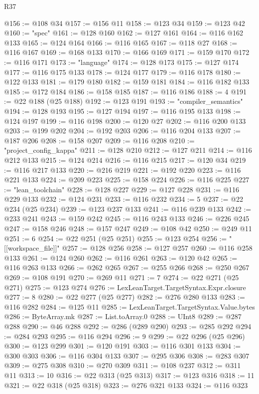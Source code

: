 \begin{lexlean}{R37}
\begin{coremodule}
@156 := @108 @34
@157 := @156 @11
@158 := @123 @34
@159 := @123 @42
@160 := "spec"
@161 := @128 @160
@162 := @127 @161
@164 := @116 @162 @133
@165 := @124 @164
@166 := @116 @165
@167 := @118 @27
@168 := @116 @167
@169 := @168 @133
@170 := @166 @169
@171 := @159 @170
@172 := @116 @171
@173 := "language"
@174 := @128 @173
@175 := @127 @174
@177 := @116 @175 @133
@178 := @124 @177
@179 := @116 @178
@180 := @122 @133
@181 := @179 @180
@182 := @159 @181
@184 := @116 @182 @133
@185 := @172 @184
@186 := @158 @185
@187 := @116 @186
@188 := 4
@191 := @22 @188 (@25 @188)
@192 := @123 @191
@193 := "compiler_semantics"
@194 := @128 @193
@195 := @127 @194
@197 := @116 @195 @133
@198 := @124 @197
@199 := @116 @198
@200 := @120 @27
@202 := @116 @200 @133
@203 := @199 @202
@204 := @192 @203
@206 := @116 @204 @133
@207 := @187 @206
@208 := @158 @207
@209 := @116 @208
@210 := "project_config_kappa"
@211 := @128 @210
@212 := @127 @211
@214 := @116 @212 @133
@215 := @124 @214
@216 := @116 @215
@217 := @120 @34
@219 := @116 @217 @133
@220 := @216 @219
@221 := @192 @220
@223 := @116 @221 @133
@224 := @209 @223
@225 := @158 @224
@226 := @116 @225
@227 := "lean_toolchain"
@228 := @128 @227
@229 := @127 @228
@231 := @116 @229 @133
@232 := @124 @231
@233 := @116 @232
@234 := 5
@237 := @22 @234 (@25 @234)
@239 := @123 @237 @133
@241 := @116 @239 @133
@242 := @233 @241
@243 := @159 @242
@245 := @116 @243 @133
@246 := @226 @245
@247 := @158 @246
@248 := @157 @247
@249 := @108 @42
@250 := @249 @11
@251 := 6
@254 := @22 @251 (@25 @251)
@255 := @123 @254
@256 := "[[workspace_file]]"
@257 := @128 @256
@258 := @127 @257
@260 := @116 @258 @133
@261 := @124 @260
@262 := @116 @261
@263 := @120 @42
@265 := @116 @263 @133
@266 := @262 @265
@267 := @255 @266
@268 := @250 @267
@269 := @108 @191
@270 := @269 @11
@271 := 7
@274 := @22 @271 (@25 @271)
@275 := @123 @274
@276 := LexLeanTarget.TargetSyntax.Expr.closure
@277 := 8
@280 := @22 @277 (@25 @277)
@282 := @276 @280 @133
@283 := @116 @282
@284 := @125 @11
@285 := LexLeanTarget.TargetSyntax.Value.bytes
@286 := ByteArray.mk
@287 := List.toArray.{0}
@288 := UInt8
@289 := @287 @288
@290 := @46 @288
@292 := @286 (@289 @290)
@293 := @285 @292
@294 := @284 @293
@295 := @116 @294
@296 := 9
@299 := @22 @296 (@25 @296)
@300 := @123 @299
@301 := @120 @191
@303 := @116 @301 @133
@304 := @300 @303
@306 := @116 @304 @133
@307 := @295 @306
@308 := @283 @307
@309 := @275 @308
@310 := @270 @309
@311 := @108 @237
@312 := @311 @11
@313 := 10
@316 := @22 @313 (@25 @313)
@317 := @123 @316
@318 := 11
@321 := @22 @318 (@25 @318)
@323 := @276 @321 @133
@324 := @116 @323

\end{coremodule}
\end{lexlean}
